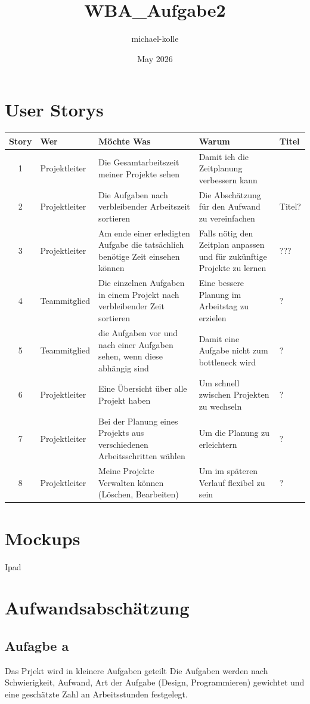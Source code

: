 \documentclass{article}
\title{WBA_Aufgabe2}
\author{michael-kolle }
\date{May 2026}
\begin{document}
\section{User Storys}

\begin{table}[h!]
\centering
\begin{tabular}{|c|p{2.5cm}|p{4cm}|p{4cm}|p{2cm}|}
 \hline
 Story & Wer & Möchte Was & Warum & Titel \\ [0.5ex] 
 \hline\hline
1 & Projektleiter & Die Gesamtarbeitszeit meiner Projekte sehen & Damit ich die Zeitplanung verbessern kann &  \\ 
\hline
2 & Projektleiter & Die Aufgaben nach verbleibender Arbeitszeit sortieren & Die Abschätzung für den Aufwand zu vereinfachen & Titel? \\
 \hline
3 & Projektleiter & Am ende einer erledigten Aufgabe die tatsächlich benötige Zeit einsehen können & Falls nötig den Zeitplan anpassen und für zukünftige Projekte zu lernen & ??? \\
 \hline
 4 & Teammitglied & Die einzelnen Aufgaben in einem Projekt nach verbleibender Zeit sortieren & Eine bessere Planung im Arbeitstag zu erzielen & ? \\
  \hline
 5 & Teammitglied & die Aufgaben vor und nach einer Aufgaben sehen, wenn diese abhängig sind & Damit eine Aufgabe nicht zum bottleneck wird & ? \\
  \hline
 6 & Projektleiter & Eine Übersicht über alle Projekt haben & Um schnell zwischen Projekten zu wechseln & ? \\
  \hline
 7 & Projektleiter & Bei der Planung eines Projekts aus verschiedenen Arbeitsschritten wählen & Um die Planung zu erleichtern & ? \\ 
  \hline
 8 & Projektleiter & Meine Projekte Verwalten können (Löschen, Bearbeiten) & Um im späteren Verlauf flexibel zu sein & ? \\ [1ex] 
 \hline
 \end{tabular}
\end{table}

\section{Mockups}
Ipad

\section{Aufwandsabschätzung}

\subsection{Aufagbe a}
Das Prjekt wird in kleinere Aufgaben geteilt
Die Aufgaben werden nach Schwierigkeit, Aufwand, Art der Aufgabe (Design, Programmieren) gewichtet und eine geschätzte Zahl an Arbeitsstunden festgelegt.
\end{document}
